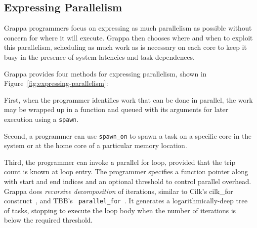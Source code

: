 



\subsection{Expressing Parallelism}

Grappa programmers focus on expressing as much
parallelism as possible without concern for where it will execute.
Grappa then chooses where and when to exploit this parallelism,
scheduling as much work as is necessary on each core to keep it busy
in the presence of system latencies and task dependences.

Grappa provides four methods for expressing parallelism, shown in
Figure~\ref{fig:expressing-parallelism}:

First, when the programmer identifies work
that can be done in parallel, the work may be wrapped up in a function
and queued with its arguments for later execution using a
\texttt{spawn}.

Second, a programmer can use \texttt{spawn\_on} to spawn a task on a
specific core in the system or at the home core of a particular memory
location.

Third, the programmer can invoke a parallel for loop, provided that the trip
count is known at loop entry. The programmer specifies a function pointer
along with start and end indices and an optional threshold to control parallel
overhead. Grappa does {\em recursive decomposition} of iterations, similar to
Cilk's cilk\_for construct~\cite {cilkforimplementation}, and TBB's {\tt
parallel\_for}~\cite{intel_tbb}. It generates a logarithmically-deep tree of
tasks, stopping to execute the loop body when the number of iterations is
below the required threshold.

